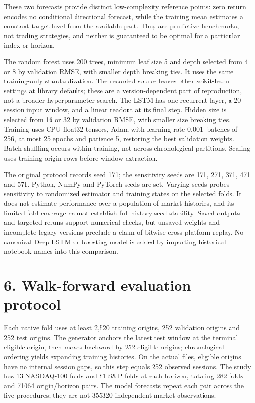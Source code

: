 \documentclass[11pt]{article}
\begin{document}
These two forecasts provide distinct low-complexity reference points: zero return encodes no conditional directional forecast, while the training mean estimates a constant target level from the available past. They are predictive benchmarks, not trading strategies, and neither is guaranteed to be optimal for a particular index or horizon.

The random forest uses 200 trees, minimum leaf size 5 and depth selected from 4 or 8 by validation RMSE, with smaller depth breaking ties. It uses the same training-only standardization. The recorded source leaves other scikit-learn settings at library defaults; these are a version-dependent part of reproduction, not a broader hyperparameter search. The LSTM has one recurrent layer, a 20-session input window, and a linear readout at its final step. Hidden size is selected from 16 or 32 by validation RMSE, with smaller size breaking ties. Training uses CPU float32 tensors, Adam with learning rate 0.001, batches of 256, at most 25 epochs and patience 5, restoring the best validation weights. Batch shuffling occurs within training, not across chronological partitions. Scaling uses training-origin rows before window extraction.

The original protocol records seed 171; the sensitivity seeds are 171, 271, 371, 471 and 571. Python, NumPy and PyTorch seeds are set. Varying seeds probes sensitivity to randomized estimator and training states on the selected folds. It does not estimate performance over a population of market histories, and its limited fold coverage cannot establish full-history seed stability. Saved outputs and targeted reruns support numerical checks, but unsaved weights and incomplete legacy versions preclude a claim of bitwise cross-platform replay. No canonical Deep LSTM or boosting model is added by importing historical notebook names into this comparison.

\section*{6. Walk-forward evaluation protocol}

Each native fold uses at least 2,520 training origins, 252 validation origins and 252 test origins. The generator anchors the latest test window at the terminal eligible origin, then moves backward by 252 eligible origins; chronological ordering yields expanding training histories. On the actual files, eligible origins have no internal session gaps, so this step equals 252 observed sessions. The study has 13 NASDAQ-100 folds and 81 S\&P folds at each horizon, totaling 282 folds and 71064 origin/horizon pairs. The model forecasts repeat each pair across the five procedures; they are not 355320 independent market observations.
\end{document}
